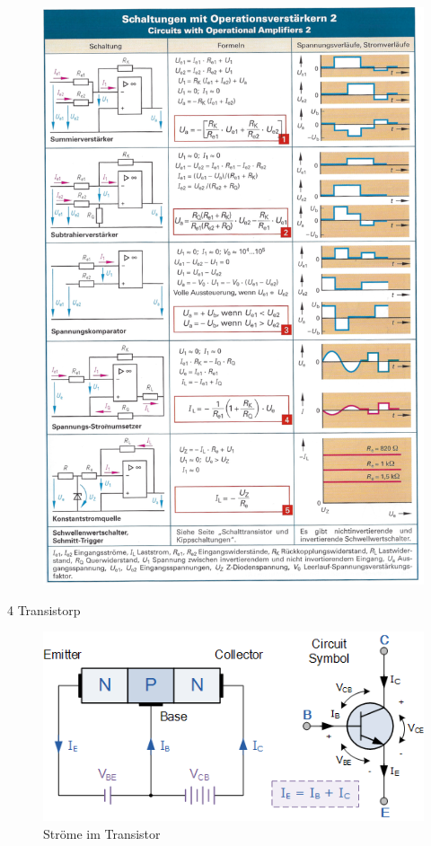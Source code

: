 \documentclass[a5paper, 12pt]{scrartcl}
\begin{document}
\begin{figure}[H]
  \centering
  \includegraphics[width=.95\textwidth]{OPV2}
\end{figure}

{\Large 4 Transistorp}

\begin{figure}[H]
  \centering
  \includegraphics[width=.6\textwidth]{Transistor}
  \caption{Ströme im Transistor}
\end{figure}
\end{document}
